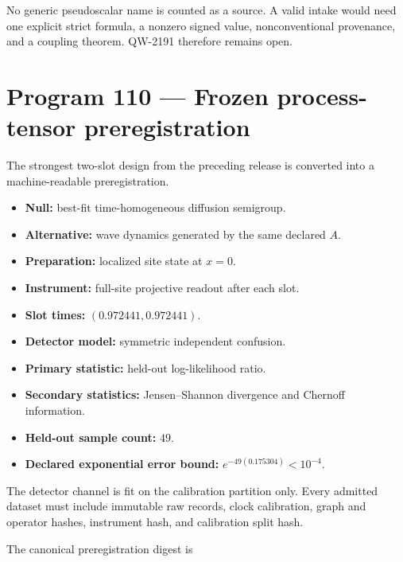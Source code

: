 \documentclass[11pt,a4paper,openany]{report}
\begin{document}
No generic pseudoscalar name is counted as a source. A valid intake would need one explicit strict formula, a nonzero signed value, nonconventional provenance, and a coupling theorem. QW-2191 therefore remains open.

\section{Program 110 --- Frozen process-tensor preregistration}

The strongest two-slot design from the preceding release is converted into a machine-readable preregistration.

\begin{itemize}
\item 
\textbf{Null:} best-fit time-homogeneous diffusion semigroup.

\item 
\textbf{Alternative:} wave dynamics generated by the same declared \(A\).

\item 
\textbf{Preparation:} localized site state at \(x=0\).

\item 
\textbf{Instrument:} full-site projective readout after each slot.

\item 
\textbf{Slot times:} \((0.972441,0.972441)\).

\item 
\textbf{Detector model:} symmetric independent confusion.

\item 
\textbf{Primary statistic:} held-out log-likelihood ratio.

\item 
\textbf{Secondary statistics:} Jensen--Shannon divergence and Chernoff information.

\item 
\textbf{Held-out sample count:} \(49\).

\item 
\textbf{Declared exponential error bound:} \(e^{-49(0.175304)}<10^{-4}\).

\end{itemize}

The detector channel is fit on the calibration partition only. Every admitted dataset must include immutable raw records, clock calibration, graph and operator hashes, instrument hash, and calibration split hash.

The canonical preregistration digest is
\end{document}
